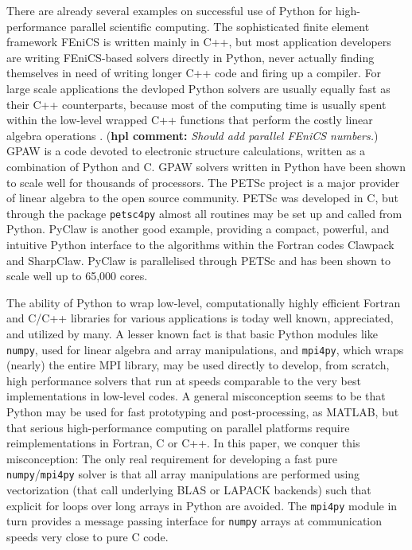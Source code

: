\documentclass[11pt, oneside]{article}
\newcommand{\hpl}[1]{({\bf hpl comment:} \emph{#1})}
\begin{document}
There are already several examples on successful use of Python for
high-performance parallel scientific computing. The sophisticated
finite element framework FEniCS \cite{fenics} is written mainly in
C++, but most application developers are writing FEniCS-based solvers
directly in Python, never actually finding themselves in need of
writing longer C++ code and firing up a compiler. For large scale
applications the devloped Python solvers are usually equally fast as
their C++ counterparts, because most of the computing time is usually
spent within the low-level wrapped C++ functions that perform the
costly linear algebra operations \cite{Mortensen2015}. \hpl{Should add parallel FEniCS numbers.}
GPAW \cite{gpaw05} is a code devoted
to electronic structure calculations, written as a combination of
Python and C. GPAW solvers written in Python have been shown to scale
well for thousands of processors.  The PETSc project \cite{petsc-web-page} is a major
provider of linear algebra to the open source community. PETSc was
developed in C, but through the package \texttt{petsc4py} almost all
routines may be set up and called from Python. PyClaw \cite{ketcheson2012}
is another good example, providing a compact, powerful, and intuitive
Python interface to the algorithms within the Fortran codes Clawpack
and SharpClaw. PyClaw is parallelised through PETSc and has been shown
to scale well up to 65,000 cores.

The ability of Python to wrap low-level, computationally highly efficient Fortran and C/C++ libraries for various applications is today well known, appreciated, and utilized by many. A lesser known fact is that basic Python modules like \texttt{numpy}, used for linear algebra and array manipulations, and \texttt{mpi4py}, which wraps (nearly) the entire MPI library, may be used directly to develop, from scratch, high performance solvers that run at speeds comparable to the very best implementations in low-level codes. A general misconception seems to be that Python may be used for fast prototyping and post-processing, as MATLAB, but that serious high-performance computing on parallel platforms require reimplementations in Fortran, C or C++. In this paper, we conquer this misconception: The only real requirement for developing a fast pure \texttt{numpy}/\texttt{mpi4py} solver is that all array manipulations are performed using vectorization (that call underlying BLAS or LAPACK backends) such that explicit for loops over long arrays in Python are avoided. The \texttt{mpi4py} module in turn provides a message passing interface for \texttt{numpy} arrays at communication speeds very close to pure C code.
\end{document}
